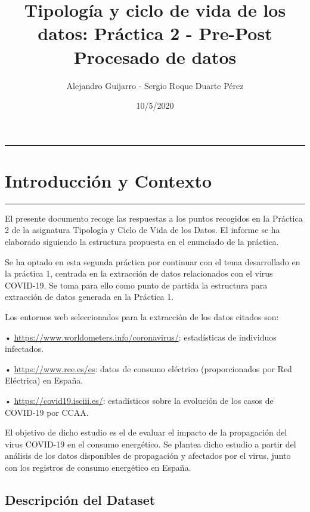 \documentclass[
]{article}
\title{Tipología y ciclo de vida de los datos: Práctica 2 - Pre-Post Procesado
de datos}
\author{Alejandro Guijarro - Sergio Roque Duarte Pérez}
\date{10/5/2020}
\begin{document}
\maketitle

{
\setcounter{tocdepth}{2}
\tableofcontents
}
\begin{center}\rule{0.5\linewidth}{0.5pt}\end{center}

\hypertarget{introducciuxf3n-y-contexto}{%
\section{Introducción y Contexto}\label{introducciuxf3n-y-contexto}}

\begin{center}\rule{0.5\linewidth}{0.5pt}\end{center}

El presente documento recoge las respuestas a los puntos recogidos en la
Práctica 2 de la asignatura Tipología y Ciclo de Vida de los Datos. El
informe se ha elaborado siguiendo la estructura propuesta en el
enunciado de la práctica.

Se ha optado en esta segunda práctica por continuar con el tema
desarrollado en la práctica 1, centrada en la extracción de datos
relacionados con el virus COVID-19. Se toma para ello como punto de
partida la estructura para extracción de datos generada en la Práctica
1.

Los entornos web seleccionados para la extracción de los datos citados
son:

• \url{https://www.worldometers.info/coronavirus/}: estadísticas de
individuos infectados.

• \url{https://www.ree.es/es}: datos de consumo eléctrico
(proporcionados por Red Eléctrica) en España.

• \url{https://covid19.isciii.es/}: estadísticos sobre la evolución de
los casos de COVID-19 por CCAA.

El objetivo de dicho estudio es el de evaluar el impacto de la
propagación del virus COVID-19 en el consumo energético. Se plantea
dicho estudio a partir del análisis de los datos disponibles de
propagación y afectados por el virus, junto con los registros de consumo
energético en España.

\hypertarget{descripciuxf3n-del-dataset}{%
\subsection{Descripción del Dataset}\label{descripciuxf3n-del-dataset}}
\end{document}
